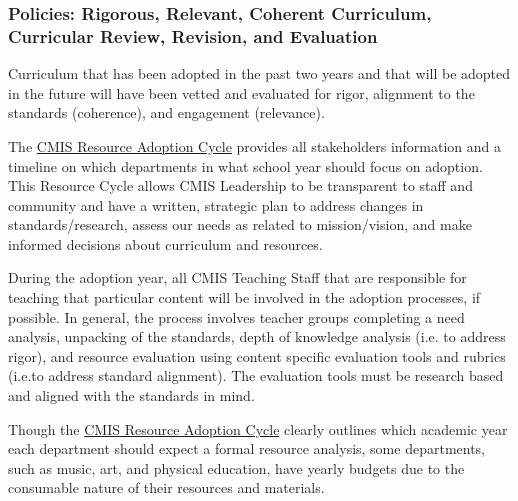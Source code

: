 \subsubsection{Policies: Rigorous, Relevant, Coherent Curriculum, Curricular Review, Revision, and Evaluation}



\begin{findings}
Curriculum that has been adopted in the past two years and that will be adopted in the future will have been vetted and evaluated for rigor, alignment to the standards (coherence), and engagement (relevance). 


The \href{https://docs.google.com/a/cmis.ac.th/document/d/1hh1nLUlJgg1hd7s6aG3u3We0L6o7Wg_ECdjc2f6DcT8/edit?usp=sharing}{CMIS Resource Adoption Cycle} provides all stakeholders information and a timeline on which departments in what school year should focus on adoption. This Resource Cycle allows CMIS Leadership to be transparent to staff and community and have a written, strategic plan to address changes in standards/research, assess our needs as related to mission/vision, and make informed decisions about curriculum and resources. 

During the adoption year, all CMIS Teaching Staff that are responsible for teaching that particular content will be involved in the adoption processes, if possible. In general, the process involves teacher groups completing a need analysis, unpacking of the standards, depth of knowledge analysis (i.e. to address rigor), and resource evaluation using content specific evaluation tools and rubrics (i.e.to address standard alignment). The evaluation tools must be research based and aligned with the standards in mind. 

Though the \href{https://docs.google.com/a/cmis.ac.th/document/d/1hh1nLUlJgg1hd7s6aG3u3We0L6o7Wg_ECdjc2f6DcT8/edit?usp=sharing}{CMIS Resource Adoption Cycle} clearly outlines which academic year each department should expect a formal resource analysis, some departments, such as music, art, and physical education, have yearly budgets due to the consumable nature of their resources and materials. 


\end{findings}
